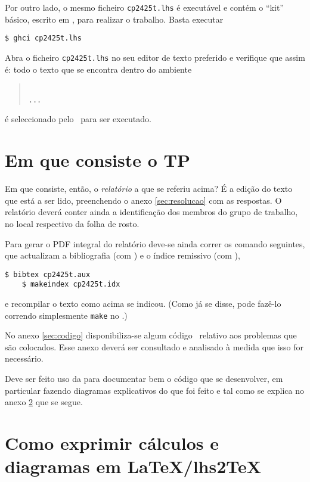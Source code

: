 \documentclass[11pt, a4paper, fleqn]{article}
\begin{document}
Por outro lado, o mesmo ficheiro \texttt{cp2425t.lhs} é executável e contém
o ``kit'' básico, escrito em \Haskell, para realizar o trabalho. Basta executar
\begin{Verbatim}[fontsize=\small]
    $ ghci cp2425t.lhs
\end{Verbatim}

\noindent Abra o ficheiro \texttt{cp2425t.lhs} no seu editor de texto preferido
e verifique que assim é: todo o texto que se encontra dentro do ambiente
\begin{quote}\small\tt
{}
\\ ... \\
\end{quote}
é seleccionado pelo \GHCi\ para ser executado.

\section{Em que consiste o TP}

Em que consiste, então, o \emph{relatório} a que se referiu acima?
É a edição do texto que está a ser lido, preenchendo o anexo \ref{sec:resolucao}
com as respostas. O relatório deverá conter ainda a identificação dos membros
do grupo de trabalho, no local respectivo da folha de rosto.

Para gerar o PDF integral do relatório deve-se ainda correr os comando seguintes,
que actualizam a bibliografia (com \Bibtex) e o índice remissivo (com \Makeindex),
\begin{Verbatim}[fontsize=\small]
    $ bibtex cp2425t.aux
    $ makeindex cp2425t.idx
\end{Verbatim}
e recompilar o texto como acima se indicou. (Como já se disse, pode fazê-lo
correndo simplesmente \texttt{make} no \container.)

No anexo \ref{sec:codigo} disponibiliza-se algum código \Haskell\ relativo
aos problemas que são colocados. Esse anexo deverá ser consultado e analisado
à medida que isso for necessário.

Deve ser feito uso da  para documentar bem o código que se
desenvolver, em particular fazendo diagramas explicativos do que foi feito e
tal como se explica no anexo \ref{sec:diagramas} que se segue.

\section{Como exprimir cálculos e diagramas em LaTeX/lhs2TeX} \label{sec:diagramas}
\end{document}
